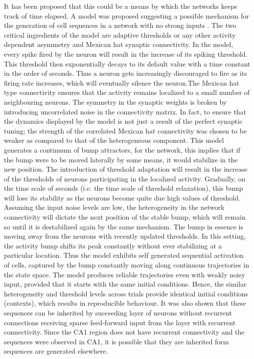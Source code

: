 It has been proposed that this could be a means by which the networks keeps track of time elapsed. A model was proposed suggesting a possible mechanism for the generation of cell sequences in a network with no strong inputs \cite{Itskov2011a}. The two critical ingredients of the model are adaptive thresholds or any other activity dependent asymmetry and Mexican hat synaptic connectivity. In the model, every spike fired by the neuron will result in the increase of its spiking threshold. This threshold then exponentially decays to its default value with a time constant in the order of seconds. Thus a neuron gets increasingly discouraged to fire as its firing rate increases, which will eventually silence the neuron.The Mexican hat type connectivity ensures that the activity remains localized to a small number of neighbouring neurons. The symmetry in the synaptic weights is broken by introducing uncorrelated noise in the connectivity matrix. In fact, to ensure that the dynamics displayed by the model is not just a result of the perfect synaptic tuning; the strength of the correlated Mexican hat connectivity was chosen to be weaker as compared to that of the heterogeneous component. This model generates a continuum of bump attractors, for the network, this implies that if the bump were to be moved laterally by some means, it would stabilize in the new position.  The introduction of threshold adaptation will result in the increase of the thresholds of neurons participating in the localized activity. Gradually, on the time scale of seconds (i.e. the time scale of threshold relaxation), this bump will lose its stability as the neurons become quite due high values of threshold. Assuming the input noise levels are low, the heterogeneity in the network connectivity will dictate the next position of the stable bump, which will remain so until it is destabilized again by the same mechanism. The bump in essence is moving away from the neurons with recently updated thresholds. In this setting, the activity bump shifts its peak constantly without ever stabilizing at a particular location. Thus the model exhibits self generated sequential activation of cells, captured by the bump constantly moving along continuous trajectories in the state space. The model produces reliable trajectories even with weakly noisy input, provided that it starts with the same initial conditions. Hence, the similar heterogeneity and threshold levels across trials provide identical initial conditions (contexts), which results in reproducible behaviour. It was also shown that these sequences can be inherited by succeeding layer of neurons without recurrent connections receiving sparse feed-forward input from the layer with recurrent connectivity. Since the CA1 region does not have recurrent connectivity and the sequences were observed in CA1, it is possible that they are inherited form sequences are generated elsewhere.\\

